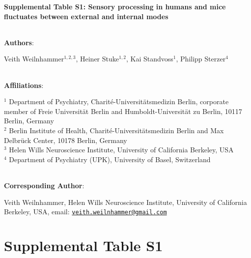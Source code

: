 \documentclass[
]{article}
\author{}
\date{\vspace{-2.5em}}
\begin{document}
\textbf{Supplemental Table S1: Sensory processing in humans and mice fluctuates between
external and internal modes}\\
\strut \\

\textbf{Authors}:

Veith Weilnhammer\(^{1,2, 3}\), Heiner Stuke\(^{1,2}\), Kai
Standvoss\(^{1}\), Philipp Sterzer\(^{4}\)\\
\strut \\
\textbf{Affiliations}:

\(^{1}\) Department of Psychiatry, Charité-Universitätsmedizin Berlin,
corporate member of Freie Universität Berlin and Humboldt-Universität zu
Berlin, 10117 Berlin, Germany\\
\(^{2}\) Berlin Institute of Health, Charité-Universitätsmedizin Berlin
and Max Delbrück Center, 10178 Berlin, Germany\\
\(^{3}\) Helen Wills Neuroscience Institute, University of California
Berkeley, USA\\
\(^{4}\) Department of Psychiatry (UPK), University of Basel,
Switzerland\\
\strut \\

\textbf{Corresponding Author}:

Veith Weilnhammer, Helen Wills Neuroscience Institute, University of
California Berkeley, USA, email:
\href{mailto:veith.weilnhammer@gmail.com}{\nolinkurl{veith.weilnhammer@gmail.com}}\\

\newpage

\hypertarget{supplemental-information}{%
\section*{Supplemental Table S1}\label{supplemental-information}}

\begingroup\fontsize{7}{9}\selectfont
\end{document}
